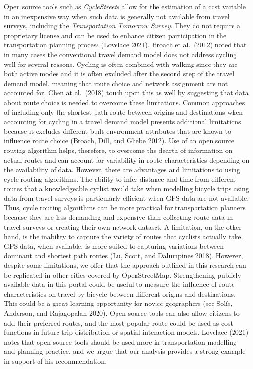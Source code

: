 \documentclass[smallextended]{svjour3}       %
\begin{document}
Open source tools such as \emph{CycleStreets} allow for the estimation
of a cost variable in an inexpensive way when such data is generally not
available from travel surveys, including the \emph{Transportation
Tomorrow Survey}. They do not require a proprietary license and can be
used to enhance citizen participation in the transportation planning
process (Lovelace 2021). Broach et al.~(2012) noted that in many cases
the conventional travel demand model does not address cycling well for
several reasons. Cycling is often combined with walking since they are
both active modes and it is often excluded after the second step of the
travel demand model, meaning that route choice and network assignment
are not accounted for. Chen at al.~(2018) touch upon this as well by
suggesting that data about route choice is needed to overcome these
limitations. Common approaches of including only the shortest path route
between origins and destinations when accounting for cycling in a travel
demand model presents additional limitations because it excludes
different built environment attributes that are known to influence route
choice (Broach, Dill, and Gliebe 2012). Use of an open source routing
algorithm helps, therefore, to overcome the dearth of information on
actual routes and can account for variability in route characteristics
depending on the availability of data. However, there are advantages and
limitations to using cycle routing algorithms. The ability to infer
distance and time from different routes that a knowledgeable cyclist
would take when modelling bicycle trips using data from travel surveys
is particularly efficient when GPS data are not available. Thus, cycle
routing algorithms can be more practical for transportation planners
because they are less demanding and expensive than collecting route data
in travel surveys or creating their own network dataset. A limitation,
on the other hand, is the inability to capture the variety of routes
that cyclists actually take. GPS data, when available, is more suited to
capturing variations between dominant and shortest path routes (Lu,
Scott, and Dalumpines 2018). However, despite some limitations, we offer
that the approach outlined in this research can be replicated in other
cities covered by OpenStreetMap. Strengthening publicly available data
in this portal could be useful to measure the influence of route
characteristics on travel by bicycle between different origins and
destinations. This could be a great learning opportunity for novice
geographers (see Solís, Anderson, and Rajagopalan 2020). Open source
tools can also allow citizens to add their preferred routes, and the
most popular route could be used as cost functions in future trip
distribution or spatial interaction models. Lovelace (2021) notes that
open source tools should be used more in transportation modelling and
planning practice, and we argue that our analysis provides a strong
example in support of his recommendation.
\end{document}
